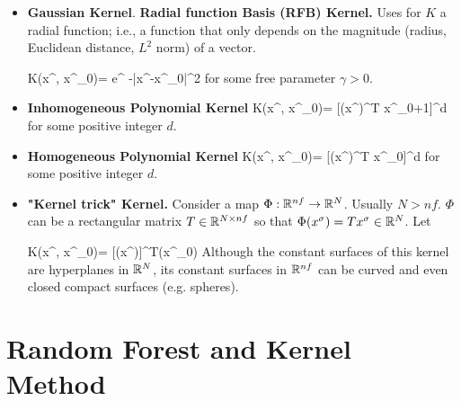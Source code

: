 \begin{itemize}
\item {\bf Gaussian Kernel}.
{\bf Radial function Basis (RFB) Kernel.}
Uses for $K$ a radial function; i.e., a
function that only depends on 
the magnitude (radius, Euclidean distance,
$L^2$ norm) of a vector.

\beq
K(x^\s, x^{\s_0})=
e^{ -\gamma |x^\s-x^{\s_0}|^2}
\eeq
for some free parameter $\gamma>0$.

\item
{\bf Inhomogeneous Polynomial Kernel}
\beq
K(x^\s, x^{\s_0})=
[(x^\s)^T x^{\s_0}+1]^d
\eeq
for some positive integer $d$.

\item
{\bf Homogeneous Polynomial Kernel}
\beq
K(x^\s, x^{\s_0})=
[(x^\s)^T x^{\s_0}]^d
\eeq
for some positive integer $d$.


\item
{\bf "Kernel trick" Kernel.}
Consider a map $\Phi:{ \mathbb{R}}^{nf}\rightarrow { \mathbb{R}}^N$.
Usually $N>nf$. $\Phi$ can be a
rectangular matrix 
$T\in{ \mathbb{R}}^{N\times nf}$
so that $\Phi(x^\sigma)=Tx^\sigma\in { \mathbb{R}}^N$. Let



\beq
K(x^\s, x^{\s_0})=
[\Phi(x^\s)]^T\Phi(x^{\s_0})
\eeq
Although the constant surfaces  of 
this kernel are
hyperplanes in ${ \mathbb{R}}^N$,
its constant
surfaces in ${ \mathbb{R}}^{nf}$
can be curved and even closed 
compact surfaces (e.g. spheres).

\end{itemize}

\section{Random Forest and Kernel Method}

